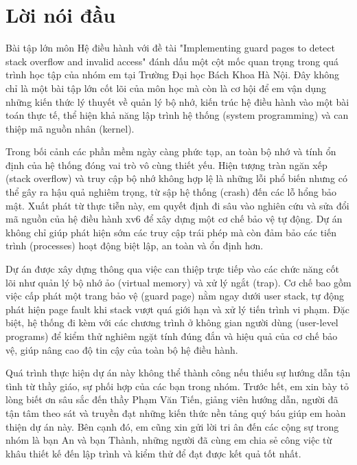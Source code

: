\chapter*{Lời nói đầu}

Bài tập lớn môn Hệ điều hành với đề tài "Implementing guard pages to detect stack overflow and invalid access" đánh dấu một cột mốc quan trọng trong quá trình học tập của nhóm em tại Trường Đại học Bách Khoa Hà Nội. Đây không chỉ là một bài tập lớn cốt lõi của môn học mà còn là cơ hội để em vận dụng những kiến thức lý thuyết về quản lý bộ nhớ, kiến trúc hệ điều hành vào một bài toán thực tế, thể hiện khả năng lập trình hệ thống (system programming) và can thiệp mã nguồn nhân (kernel).

Trong bối cảnh các phần mềm ngày càng phức tạp, an toàn bộ nhớ và tính ổn định của hệ thống đóng vai trò vô cùng thiết yếu. Hiện tượng tràn ngăn xếp (stack overflow) và truy cập bộ nhớ không hợp lệ là những lỗi phổ biến nhưng có thể gây ra hậu quả nghiêm trọng, từ sập hệ thống (crash) đến các lỗ hổng bảo mật. Xuất phát từ thực tiễn này, em quyết định đi sâu vào nghiên cứu và sửa đổi mã nguồn của hệ điều hành xv6 để xây dựng một cơ chế bảo vệ tự động. Dự án không chỉ giúp phát hiện sớm các truy cập trái phép mà còn đảm bảo các tiến trình (processes) hoạt động biệt lập, an toàn và ổn định hơn.

Dự án được xây dựng thông qua việc can thiệp trực tiếp vào các chức năng cốt lõi như quản lý bộ nhớ ảo (virtual memory) và xử lý ngắt (trap). Cơ chế bao gồm việc cấp phát một trang bảo vệ (guard page) nằm ngay dưới user stack, tự động phát hiện page fault khi stack vượt quá giới hạn và xử lý tiến trình vi phạm. Đặc biệt, hệ thống đi kèm với các chương trình ở không gian người dùng (user-level programs) để kiểm thử nghiêm ngặt tính đúng đắn và hiệu quả của cơ chế bảo vệ, giúp nâng cao độ tin cậy của toàn bộ hệ điều hành.

Quá trình thực hiện dự án này không thể thành công nếu thiếu sự hướng dẫn tận tình từ thầy giáo, sự phối hợp của các bạn trong nhóm. Trước hết, em xin bày tỏ lòng biết ơn sâu sắc đến thầy Phạm Văn Tiến, giảng viên hướng dẫn, người đã tận tâm theo sát và truyền đạt những kiến thức nền tảng quý báu giúp em hoàn thiện dự án này. Bên cạnh đó, em cũng xin gửi lời tri ân đến các cộng sự trong nhóm là bạn An và bạn Thành, những người đã cùng em chia sẻ công việc từ khâu thiết kế đến lập trình và kiểm thử để đạt được kết quả tốt nhất.

